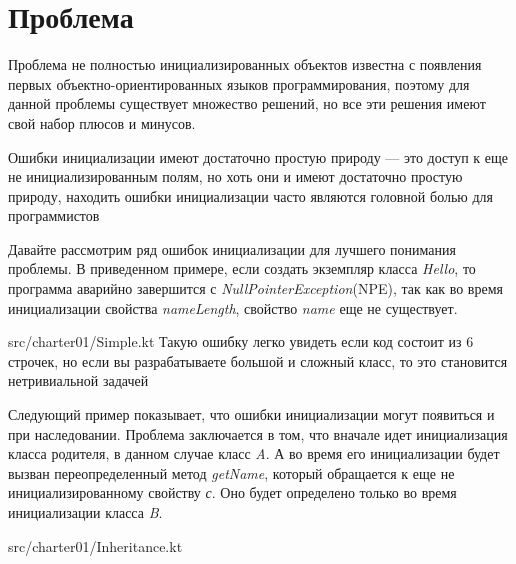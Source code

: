 \chapter{Проблема}\label{ch:проблема-}


Проблема не полностью инициализированных объектов известна с появления первых объектно-ориентированных языков программирования,
поэтому для данной проблемы существует множество решений, но все эти решения имеют свой набор плюсов и минусов.

Ошибки инициализации имеют достаточно простую природу --- это доступ к еще не инициализированным полям,
но хоть они и имеют достаточно простую природу, находить ошибки инициализации часто являются головной болью для программистов

Давайте рассмотрим ряд ошибок инициализации для лучшего понимания проблемы.
В приведенном примере, если создать экземпляр класса \emph{Hello}, то программа аварийно завершится
с \emph{NullPointerException}(NPE),
так как во время инициализации свойства \emph{nameLength}, свойство \emph{name} еще не существует.

{src/charter01/Simple.kt}
Такую ошибку легко увидеть если код состоит из 6 строчек, но если вы разрабатываете большой и сложный класс,
то это становится нетривиальной задачей

Следующий пример показывает, что ошибки инициализации могут появиться и при наследовании.
Проблема заключается в том, что вначале идет инициализация класса родителя, в данном случае класс \emph{A}.
А во время его инициализации будет вызван переопределенный метод \emph{getName},
который обращается к еще не инициализированному свойству \emph{с}.
Оно будет определено только во время инициализации класса \emph{B}.

{src/charter01/Inheritance.kt}

